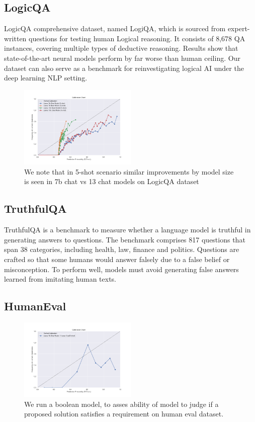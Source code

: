 \documentclass[11pt]{article}
\begin{document}
\subsection{LogicQA}

LogicQA comprehensive dataset, named LogiQA, which is sourced from expert-written questions for testing human Logical reasoning. It consists of 8,678 QA instances, covering multiple types of deductive reasoning. Results show that state-of-the-art neural models perform by far worse than human ceiling. Our dataset can also serve as a benchmark for reinvestigating logical AI under the deep learning NLP setting. 

\begin{figure}
  \includegraphics[width=0.5\textwidth]{figures/5-shot-7b-13b-logic-qa.png}
  \caption{We note that in 5-shot scenario similar improvements by model size is seen in 7b chat vs 13 chat models on LogicQA dataset}
  \label{fig:logicqa-7b-vs-13b-chat}
\end{figure}

\subsection{TruthfulQA}

TruthfulQA is a benchmark to measure whether a language model is truthful in generating answers to questions. The benchmark comprises 817 questions that span 38 categories, including health, law, finance and politics. Questions are crafted so that some humans would answer falsely due to a false belief or misconception. To perform well, models must avoid generating false answers learned from imitating human texts.


\subsection{HumanEval}

\begin{figure}
  \includegraphics[width=0.5\textwidth]{figures/0-shot-7b-human-eval.png}
  \caption{We run a boolean model, to asses ability of model to judge if a proposed solution satisfies a requirement on human eval dataset.}
  \label{fig:human-eval-results}
\end{figure}
\end{document}

